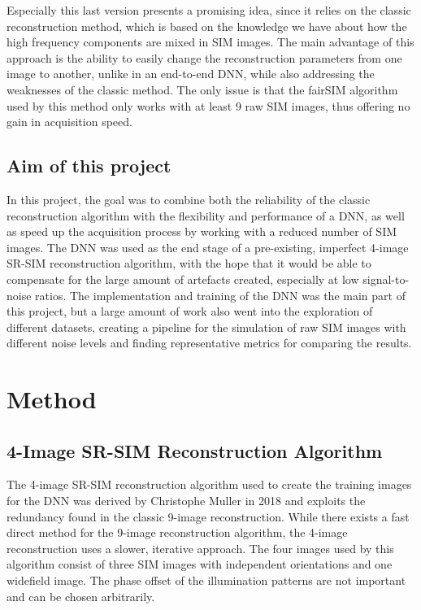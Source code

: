 \documentclass[conference]{IEEEtran}
\begin{document}
Especially this last version presents a promising idea, since it relies on the classic reconstruction method, which is based on the knowledge we have about how the high frequency components are mixed in SIM images. The main advantage of this approach is the ability to easily change the reconstruction parameters from one image to another, unlike in an end-to-end DNN, while also addressing the weaknesses of the classic method. The only issue is that the fairSIM algorithm used by this method only works with at least 9 raw SIM images, thus offering no gain in acquisition speed.

\subsection{Aim of this project}
In this project, the goal was to combine both the reliability of the classic reconstruction algorithm with the flexibility and performance of a DNN, as well as speed up the acquisition process by working with a reduced number of SIM images. The DNN was used as the end stage of a pre-existing, imperfect 4-image SR-SIM reconstruction algorithm, with the hope that it would be able to compensate for the large amount of artefacts created, especially at low signal-to-noise ratios. The implementation and training of the DNN was the main part of this project, but a large amount of work also went into the exploration of different datasets, creating a pipeline for the simulation of raw SIM images with different noise levels and finding representative metrics for comparing the results.

\section{Method}
\subsection{4-Image SR-SIM Reconstruction Algorithm}
The 4-image SR-SIM reconstruction algorithm used to create the training images for the DNN was derived by Christophe Muller in 2018 \cite{muller_project} and exploits the redundancy found in the classic 9-image reconstruction. While there exists a fast direct method for the 9-image reconstruction algorithm, the 4-image reconstruction uses a slower, iterative approach. The four images used by this algorithm consist of three SIM images with independent orientations and one widefield image. The phase offset of the illumination patterns are not important and can be chosen arbitrarily.
\end{document}
